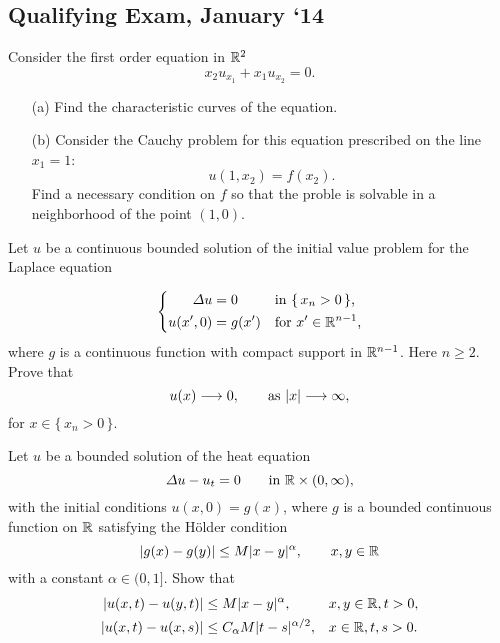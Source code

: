\subsection{Qualifying Exam, January `14}
\begin{problem}
  Consider the first order equation in \(\mathbb{R}^2\)
  \[
    x_2u_{x_1}+x_1u_{x_2}=0.
  \]
  \begin{itemize}[noitemsep]
  \item[(a)] Find the characteristic curves of the equation.
  \item[(b)] Consider the Cauchy problem for this equation prescribed on
    the line \(x_1=1\):
    \[
      u(1,x_2)=f(x_2).
    \]
    Find a necessary condition on \(f\) so that the proble is solvable in a
    neighborhood of the point \((1,0)\).
  \end{itemize}
\end{problem}
\begin{solution*}
\end{solution*}

\begin{problem}
  Let \(u\) be a continuous bounded solution of the initial value problem
  for the Laplace equation

  \[
    \left\{
      \begin{aligned}
        \Lap u&=0&&\text{in \(\{\,x_n>0\,\}\),}\\
        u(x',0)&=g(x')&&\text{for \(x'\in\R^{n-1}\),}
      \end{aligned}
    \right.
  \]
  where \(g\) is a continuous function with compact support in
  \(\mathbb{R}^{n-1}\). Here \(n\geq 2\). Prove that
  \[
    u(x)\To 0,\qquad%
    \text{as } |x|\To \infty,
  \]
  for \(x\in\{\,x_n>0\,\}\).
\end{problem}
\begin{solution*}
\end{solution*}

\begin{problem}
  Let \(u\) be a bounded solution of the heat equation
  \[
    \Lap u-u_t=0\qquad\text{in \(\R\times(0,\infty)\),}
  \]
  with the initial conditions \(u(x,0)=g(x)\), where \(g\) is a bounded
  continuous function on \(\mathbb{R}\) satisfying the Hölder condition
  \[
    |g(x)-g(y)|\leq M|x-y|^\alpha,\qquad x,y\in\mathbb{R}
  \]
  with a constant \(\alpha\in (0, 1]\). Show that
  \[
    \begin{aligned}
      |u(x,t)-u(y,t)|&\leq M|x-y|^\alpha,&&x,y\in\mathbb{R},t>0,\\
      |u(x,t)-u(x,s)|&\leq C_\alpha M|t-s|^{\alpha/2},&&x\in\mathbb{R},t,s>0.
    \end{aligned}
  \]

  \noindent [\emph{Hint:} For the last inequality, in the representation
  formula of \(u(x,t)\) as a convolution with the heat kernel
  \(\Phi(y,t)\), make a change of variables \(z=y/\sqrt{t}\) and use that
  $\left|\sqrt{t}-\sqrt{s}\right|\leq\sqrt{|t-s|}$.]
\end{problem}
\begin{solution*}
\end{solution*}

